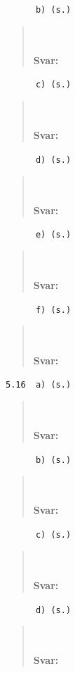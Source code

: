 \documentclass[a4paper]{article}
\newcommand{\tskcol}[1]{\textcolor{tskcol}{#1}}
\begin{document}
	\texttt{\tskcol{~~~~~~b) (s.)}}
	\begin{quotation}
		\noindent
		\\ \\
		\textbf{Svar:}
	\end{quotation}
	
	\texttt{\tskcol{~~~~~~c) (s.)}}
	\begin{quotation}
		\noindent
		\\ \\
		\textbf{Svar:}
	\end{quotation}
	
	\texttt{\tskcol{~~~~~~d) (s.)}}
	\begin{quotation}
		\noindent
		\\ \\
		\textbf{Svar:}
	\end{quotation}
	
	\texttt{\tskcol{~~~~~~e) (s.)}}
	\begin{quotation}
		\noindent
		\\ \\
		\textbf{Svar:}
	\end{quotation}
	
	\texttt{\tskcol{~~~~~~f) (s.)}}
	\begin{quotation}
		\noindent
		\\ \\
		\textbf{Svar:}
	\end{quotation}
	
	\texttt{\tskcol{5.16~~a) (s.)}}
	\begin{quotation}
		\noindent
		\\ \\
		\textbf{Svar:}
	\end{quotation}
	
	\texttt{\tskcol{~~~~~~b) (s.)}}
	\begin{quotation}
		\noindent
		\\ \\
		\textbf{Svar:}
	\end{quotation}
	
	\texttt{\tskcol{~~~~~~c) (s.)}}
	\begin{quotation}
		\noindent
		\\ \\
		\textbf{Svar:}
	\end{quotation}
	
	\texttt{\tskcol{~~~~~~d) (s.)}}
	\begin{quotation}
		\noindent
		\\ \\
		\textbf{Svar:}
	\end{quotation}
	
\end{document}

